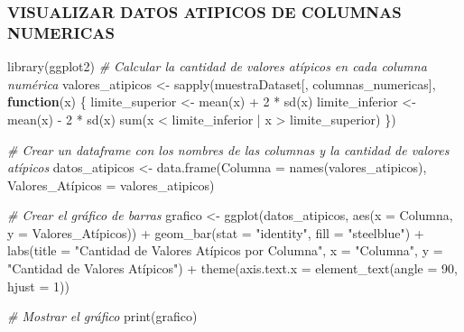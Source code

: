 \documentclass[
]{article}
\newenvironment{Shaded}{\begin{snugshade}}{\end{snugshade}}
\newcommand{\AttributeTok}[1]{\textcolor[rgb]{0.77,0.63,0.00}{#1}}
\newcommand{\CommentTok}[1]{\textcolor[rgb]{0.56,0.35,0.01}{\textit{#1}}}
\newcommand{\ControlFlowTok}[1]{\textcolor[rgb]{0.13,0.29,0.53}{\textbf{#1}}}
\newcommand{\DecValTok}[1]{\textcolor[rgb]{0.00,0.00,0.81}{#1}}
\newcommand{\FunctionTok}[1]{\textcolor[rgb]{0.00,0.00,0.00}{#1}}
\newcommand{\NormalTok}[1]{#1}
\newcommand{\OtherTok}[1]{\textcolor[rgb]{0.56,0.35,0.01}{#1}}
\newcommand{\SpecialCharTok}[1]{\textcolor[rgb]{0.00,0.00,0.00}{#1}}
\newcommand{\StringTok}[1]{\textcolor[rgb]{0.31,0.60,0.02}{#1}}
\begin{document}
\hypertarget{visualizar-datos-atipicos-de-columnas-numericas}{%
\subsubsection{VISUALIZAR DATOS ATIPICOS DE COLUMNAS
NUMERICAS}\label{visualizar-datos-atipicos-de-columnas-numericas}}

\begin{Shaded}
\begin{Highlighting}[]
\FunctionTok{library}\NormalTok{(ggplot2)}
\CommentTok{\# Calcular la cantidad de valores atípicos en cada columna numérica}
\NormalTok{valores\_atipicos }\OtherTok{\textless{}{-}} \FunctionTok{sapply}\NormalTok{(muestraDataset[, columnas\_numericas], }\ControlFlowTok{function}\NormalTok{(x) \{}
\NormalTok{  limite\_superior }\OtherTok{\textless{}{-}} \FunctionTok{mean}\NormalTok{(x) }\SpecialCharTok{+} \DecValTok{2} \SpecialCharTok{*} \FunctionTok{sd}\NormalTok{(x)}
\NormalTok{  limite\_inferior }\OtherTok{\textless{}{-}} \FunctionTok{mean}\NormalTok{(x) }\SpecialCharTok{{-}} \DecValTok{2} \SpecialCharTok{*} \FunctionTok{sd}\NormalTok{(x)}
  \FunctionTok{sum}\NormalTok{(x }\SpecialCharTok{\textless{}}\NormalTok{ limite\_inferior }\SpecialCharTok{|}\NormalTok{ x }\SpecialCharTok{\textgreater{}}\NormalTok{ limite\_superior)}
\NormalTok{\})}

\CommentTok{\# Crear un dataframe con los nombres de las columnas y la cantidad de valores atípicos}
\NormalTok{datos\_atipicos }\OtherTok{\textless{}{-}} \FunctionTok{data.frame}\NormalTok{(}\AttributeTok{Columna =} \FunctionTok{names}\NormalTok{(valores\_atipicos),}
\NormalTok{                             Valores\_Atípicos }\OtherTok{=}\NormalTok{ valores\_atipicos)}

\CommentTok{\# Crear el gráfico de barras}
\NormalTok{grafico }\OtherTok{\textless{}{-}} \FunctionTok{ggplot}\NormalTok{(datos\_atipicos, }\FunctionTok{aes}\NormalTok{(}\AttributeTok{x =}\NormalTok{ Columna, }\AttributeTok{y =}\NormalTok{ Valores\_Atípicos)) }\SpecialCharTok{+}
  \FunctionTok{geom\_bar}\NormalTok{(}\AttributeTok{stat =} \StringTok{"identity"}\NormalTok{, }\AttributeTok{fill =} \StringTok{"steelblue"}\NormalTok{) }\SpecialCharTok{+}
  \FunctionTok{labs}\NormalTok{(}\AttributeTok{title =} \StringTok{"Cantidad de Valores Atípicos por Columna"}\NormalTok{,}
       \AttributeTok{x =} \StringTok{"Columna"}\NormalTok{, }\AttributeTok{y =} \StringTok{"Cantidad de Valores Atípicos"}\NormalTok{) }\SpecialCharTok{+}
  \FunctionTok{theme}\NormalTok{(}\AttributeTok{axis.text.x =} \FunctionTok{element\_text}\NormalTok{(}\AttributeTok{angle =} \DecValTok{90}\NormalTok{, }\AttributeTok{hjust =} \DecValTok{1}\NormalTok{))}

\CommentTok{\# Mostrar el gráfico}
\FunctionTok{print}\NormalTok{(grafico)}
\end{Highlighting}
\end{Shaded}
\end{document}
